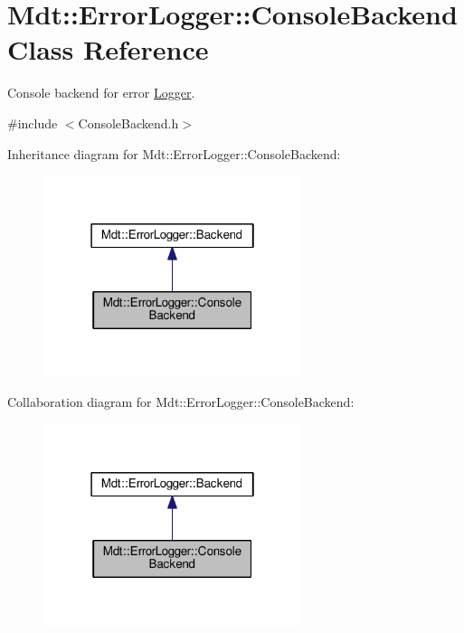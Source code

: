 \hypertarget{class_mdt_1_1_error_logger_1_1_console_backend}{}\section{Mdt\+:\+:Error\+Logger\+:\+:Console\+Backend Class Reference}
\label{class_mdt_1_1_error_logger_1_1_console_backend}


Console backend for error \hyperlink{class_mdt_1_1_error_logger_1_1_logger}{Logger}.  




{\ttfamily \#include $<$Console\+Backend.\+h$>$}



Inheritance diagram for Mdt\+:\+:Error\+Logger\+:\+:Console\+Backend\+:\nopagebreak
\begin{figure}[H]
\begin{center}
\leavevmode
\includegraphics[width=214pt]{class_mdt_1_1_error_logger_1_1_console_backend__inherit__graph}
\end{center}
\end{figure}


Collaboration diagram for Mdt\+:\+:Error\+Logger\+:\+:Console\+Backend\+:\nopagebreak
\begin{figure}[H]
\begin{center}
\leavevmode
\includegraphics[width=214pt]{class_mdt_1_1_error_logger_1_1_console_backend__coll__graph}
\end{center}
\end{figure}
